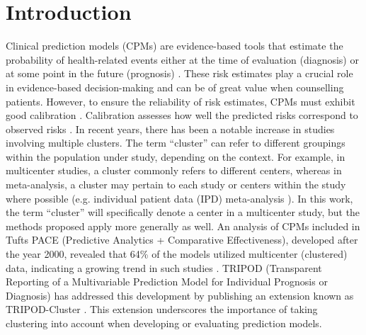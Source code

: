 \newpage

\section{Introduction}
Clinical prediction models (\glspl{CPM}) are evidence-based tools that estimate the probability of health-related events either at the time of evaluation (diagnosis) or at some point in the future (prognosis) \cite{steyerbergClinicalPredictionModels2009,vansmedenClinicalPredictionModels2021}. These risk estimates play a crucial role in evidence-based decision-making and can be of great value when counselling patients. However, to ensure the reliability of risk estimates, \glspl{CPM} must exhibit good calibration \cite{vancalsterCalibrationHierarchyRisk2016}. Calibration assesses how well the predicted risks correspond to observed risks \cite{vancalsterCalibrationHierarchyRisk2016}. In recent years, there has been a notable increase in studies involving multiple clusters. The term \enquote{cluster} can refer to different groupings within the population under study, depending on the context. For example, in multicenter studies, a cluster commonly refers to different centers, whereas in meta-analysis, a cluster may pertain to each study or centers within the study where possible (e.g. individual patient data (\gls{IPD}) meta-analysis \cite{rileyIndividualParticipantData2021a}). In this work, the term \enquote{cluster} will specifically denote a center in a multicenter study, but the methods proposed apply more generally as well. An analysis of \glspl{CPM} included in Tufts PACE (Predictive Analytics + Comparative Effectiveness), developed after the year 2000, revealed that 64\% of the models utilized multicenter (clustered) data, indicating a growing trend in such studies \cite{wynantsUntappedPotentialMulticenter2019,wesslerTuftsPACEClinical2017}. \gls{TRIPOD} (Transparent Reporting of a Multivariable Prediction Model for Individual Prognosis or Diagnosis) has addressed this development by publishing an extension known as \gls{TRIPOD}-Cluster \cite{debrayTransparentReportingMultivariable2023}. This extension underscores the importance of taking clustering into account when developing or evaluating prediction models.

